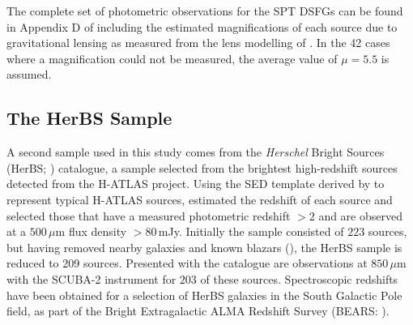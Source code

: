 The complete set of photometric observations for the SPT DSFGs can be found in Appendix D of \citealt{Reuter_2020} including the estimated magnifications of each source due to gravitational lensing as measured from the lens modelling of \citealt{Spilker_2016}. In the 42 cases where a magnification could not be measured, the average value of $\mu = 5.5$ is assumed.

\subsection{The HerBS Sample}

A second sample used in this study comes from the \textit{Herschel} Bright Sources (HerBS; \citealt{Bakx_2018}) catalogue, a sample selected from the brightest high-redshift sources detected from the H-ATLAS project. Using the SED template derived by \citealt{Pearson_2013} to represent typical H-ATLAS sources, \citealt{Bakx_2018} estimated the redshift of each source and selected those that have a measured photometric redshift $> 2$ and are observed at a $500\,\mu$m flux density $> 80\,$mJy. Initially the sample consisted of $223$ sources, but having removed nearby galaxies and known blazars (\citealt{Negrello_2010, Lopez-Caniego_2013}), the HerBS sample is reduced to 209 sources. Presented with the catalogue are observations at $850\,\mu$m with the SCUBA-2 instrument for $203$ of these sources. Spectroscopic redshifts have been obtained for a selection of HerBS galaxies in the South Galactic Pole field, as part of the Bright Extragalactic ALMA Redshift Survey (BEARS: \citealt{Urquhart_2022, Bendo_2023, Hagimoto_2023}).

